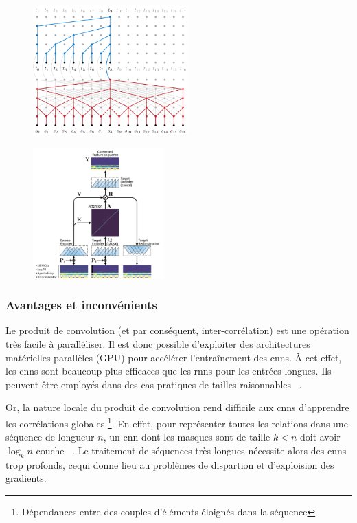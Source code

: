 \begin{figure}[H]
    \centering
    \begin{minipage}{.5\linewidth}
        \centering
        \includegraphics[height=5cm]{assets/images/bytenet.png}
        \label{fig.bytenet}
    \end{minipage}%
    \begin{minipage}{.5\linewidth}
        \centering
        \includegraphics[height=5cm]{assets/images/convs2s.png}
        \label{fig.convs2s}
    \end{minipage}
\end{figure}


\subsubsection{Avantages et inconvénients}

Le produit de convolution (et par conséquent, inter-corrélation) 
est une opération très facile à paralléliser.
Il est donc possible d'exploiter des architectures matérielles parallèles (GPU) 
pour accélérer l'entraînement des \glspl{cnn}.
À cet effet, les \glspl{cnn} sont beaucoup plus efficaces que les \glspl{rnn} pour les entrées longues. 
Ils peuvent être employés dans des cas pratiques de tailles raisonnables%
~\cite{Li_Zhang_Huang_Wang_Zheng_2016}.

Or, la nature locale du produit de convolution
rend difficile aux \glspl{cnn} d'apprendre les corrélations globales%
\footnote{Dépendances entre des couples d'éléments éloignés dans la séquence}.
En effet, pour représenter toutes les relations dans une séquence de longueur \(n\),
un \gls{cnn} dont les masques sont de taille \(k < n\) doit avoir \(\log_k n\) couche%
~\cite{attention}.
Le traitement de séquences très longues nécessite alors des \glspl{cnn} trop profonds,
cequi donne lieu au problèmes de dispartion et d'exploision des gradients.